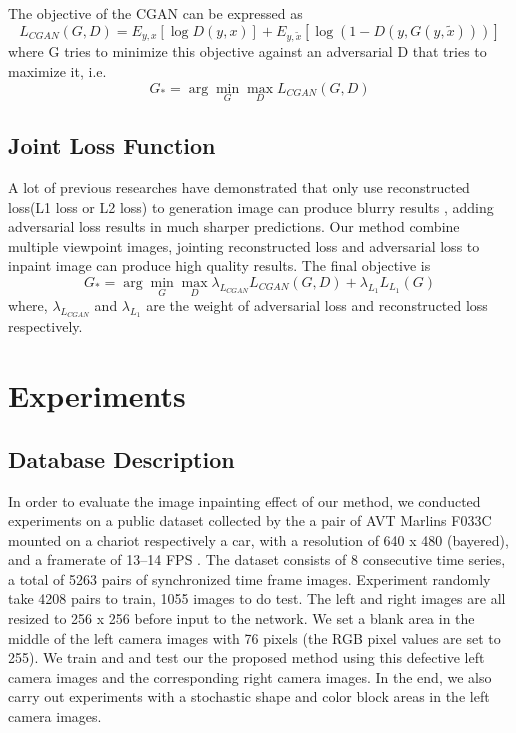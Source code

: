 \documentclass{IEEE_lsens}
\begin{document}
The objective of the CGAN can be expressed as 
\begin{equation}
    L_{CGAN} (G,D) = E_{y,x} [\log D(y,x)] + E_{y,\tilde{x}} [\log(1-D(y,G(y,\tilde{x})))]
\end{equation}
where G tries to minimize this objective against an adversarial D that tries to maximize it, i.e. 
\begin{equation}
    G_{*} = \arg \min_{G} \max_{D} L_{CGAN}(G,D)
\end{equation}

\subsection{Joint Loss Function}
A lot of previous researches have demonstrated that only use reconstructed loss(L1 loss or L2 loss) to generation image can produce blurry results \cite{BoesenLindboLarsen2015:apa:Autoencoding,Pathak2016::Context,Isola2017::Image}, adding adversarial loss results in much sharper predictions. Our method combine multiple viewpoint images, jointing reconstructed loss and adversarial loss to inpaint image can produce high quality results.
The final objective is
\begin{equation}
    G_{*} = \arg \min_{G} \max_{D} {\lambda}_{L_{CGAN}} L_{CGAN}(G,D) + {\lambda}_{L_1} L_{L_1}(G)
\end{equation}
where, ${\lambda}_{L_{CGAN}}$ and ${\lambda}_{L_1}$ are the weight of adversarial loss and reconstructed loss respectively.

\section{Experiments}

\subsection{Database Description}

In order to evaluate the image inpainting effect of our method, we conducted experiments on a public dataset collected by the a pair of AVT Marlins F033C mounted on a chariot respectively a car, with a resolution of 640 x 480 (bayered), and a framerate of 13--14 FPS \cite{Ess2008::mobile}. The dataset consists of 8 consecutive time series, a total of 5263 pairs of synchronized time frame images. Experiment randomly take 4208 pairs to train, 1055 images to do test. The left and right images are all resized to 256 x 256 before input to the network. We set a blank area in the middle of the left camera images with 76 pixels (the RGB pixel values are set to 255). We train and and test our the proposed method using this defective left camera images and the corresponding right camera images. In the end, we also carry out experiments with a stochastic shape and color block areas in the left camera images. 
\end{document}
